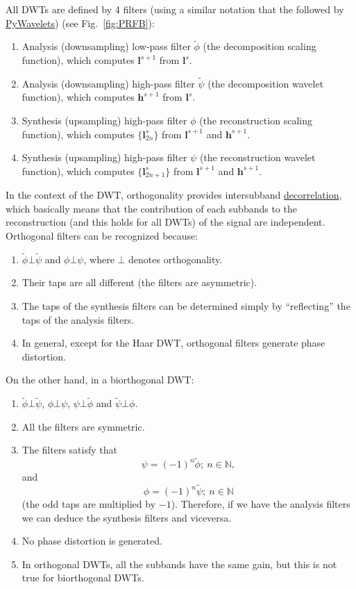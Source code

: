 All DWTs are defined by 4 filters (using a similar notation that the
followed by \href{https://pywavelets.readthedocs.io}{PyWavelets}) (see
Fig.~\ref{fig:PRFB}):
\begin{enumerate}
\item Analysis (downsampling) low-pass filter $\tilde\phi$ (the
  decomposition scaling function), which computes ${\mathbf l}^{s+1}$
  from ${\mathbf l}^s$.
\item Analysis (downsampling) high-pass filter $\tilde\psi$ (the
  decomposition wavelet function), which computes ${\mathbf h}^{s+1}$
  from ${\mathbf l}^s$.
\item Synthesis (upsampling) high-pass filter $\phi$ (the
  reconstruction scaling function), which computes $\{{\mathbf
    l}^s_{2n}\}$ from ${\mathbf l}^{s+1}$ and ${\mathbf h}^{s+1}$.
\item Synthesis (upsampling) high-pass filter $\psi$ (the
  reconstruction wavelet function), which computes $\{{\mathbf
    l}^s_{2n+1}\}$ from ${\mathbf l}^{s+1}$ and ${\mathbf h}^{s+1}$.
\end{enumerate}

In the context of the DWT, orthogonality provides intersubband
\href{https://en.wikipedia.org/wiki/Decorrelation}{decorrelation},
which basically means that the contribution of each subbands to the
reconstruction (and this holds for all DWTs) of the signal are
independent. Orthogonal filters can be recognized because:
\begin{enumerate}
\item $\tilde\phi\bot\tilde\psi$ and $\phi\bot\psi$, where $\bot$
  denotes orthogonality.
\item Their taps are all different (the filters are asymmetric).
\item The taps of the synthesis filters can be determined simply by
  ``reflecting'' the taps of the analysis filters.
\item In general, except for the Haar DWT, orthogonal filters generate
  phase distortion.
\end{enumerate}

On the other hand, in a biorthogonal DWT:
\begin{enumerate}
\item $\tilde\phi\bot\tilde\psi$, $\phi\bot\psi$, $\psi\bot\tilde\phi$
  and $\tilde\psi\bot\phi$.
\item All the filters are symmetric.
\item The filters satisfy that
  \begin{equation}
    \psi=(-1)^n\tilde\phi;~n\in\mathbb{N},
  \end{equation}
  and
  \begin{equation}
    \phi=(-1)^n\tilde\psi;~n\in\mathbb{N}
  \end{equation}
    (the odd taps are multiplied by $-1$). Therefore, if we have the
  analysis filters we can deduce the synthesis filters and viceversa.
\item No phase distortion is generated.
\item In orthogonal DWTs, all the subbands have the same gain,
  but this is not true for biorthogonal DWTs.
\end{enumerate}

